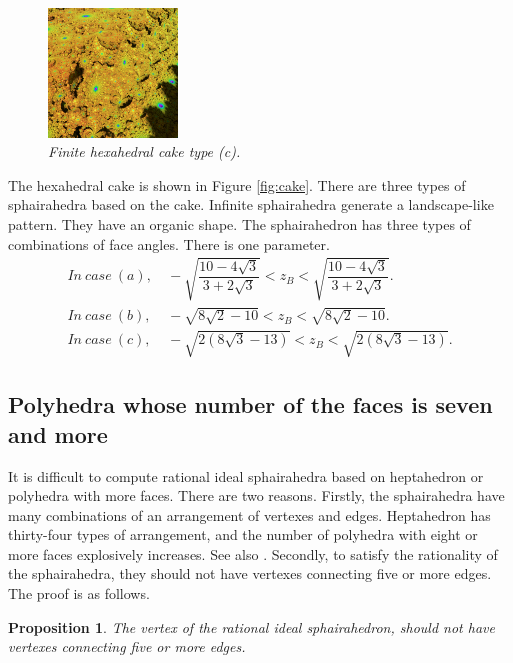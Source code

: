 \documentclass[suppldata, dvipdfmx]{interact}
\theoremstyle{plain}%
\newtheorem{proposition}[theorem]{Proposition}
\theoremstyle{definition}
\theoremstyle{remark}
\theoremstyle{problemstyle}
\begin{document}
\begin{figure}[H]
\begin{minipage}{0.5\textwidth}
  \begin{minipage}[t]{0.24\textwidth}
   \centering
   \includegraphics[width=1.35in, height=1.35in,
   keepaspectratio]{./img/sphairahedron/hexahedralCake2/limitsetInf_c.png} 
  \end{minipage}
  \hspace*{\fill}
  \caption{\textit{Finite hexahedral cake type (c).}}
  \label{}
 \end{minipage}
\end{figure}

The hexahedral cake is shown in Figure \ref{fig:cake}. There are three
types of sphairahedra based on the cake.
Infinite sphairahedra generate a landscape-like pattern.
They have an organic shape.
The sphairahedron has three types of combinations of face angles.
There is one parameter.
\begin{align*}
 In~case~(a),&~- \sqrt{\dfrac{10 - 4 \sqrt{3}}{3 + 2 \sqrt{3}}} < z_B <\sqrt{\dfrac{10 - 4 \sqrt{3}}{3 + 2 \sqrt{3}}}.\\ 
 In~case~(b),&~-\sqrt{8\sqrt{2}-10} < z_B < \sqrt{8\sqrt{2} - 10}.\\
 In~case~(c),&~-\sqrt{2(8\sqrt{3} - 13)} < z_B < \sqrt{2(8\sqrt{3} - 13)}.
\end{align*}

\subsection{Polyhedra whose number of the faces is seven and more}

It is difficult to compute rational ideal sphairahedra based on
heptahedron or polyhedra with more faces.
There are two reasons.
Firstly, the sphairahedra have many combinations of an arrangement of
vertexes and edges. 
Heptahedron has thirty-four types of arrangement, and
the number of polyhedra with eight or more faces explosively
increases. See also \cite{countingPolyhedra}.
Secondly, to satisfy the rationality of the sphairahedra, they should not
have vertexes connecting five or more edges.
The proof is as follows.

\begin{proposition}
 The vertex of the rational ideal sphairahedron, should not
 have vertexes connecting five or more edges.
\end{proposition}
\end{document}
